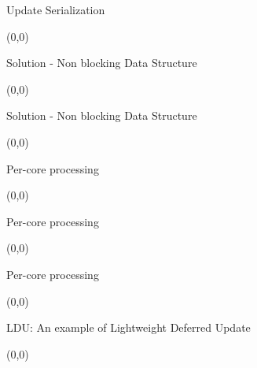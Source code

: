 \documentclass[english]{beamer} %
\begin{document}
\begin{frame}{Update Serialization}
\begin{textblock}{1}(0,0)
\end{textblock}
\end{frame}


\begin{frame}{Solution - Non blocking Data Structure}
\begin{textblock}{1}(0,0)
\end{textblock}
\end{frame}

\begin{frame}{Solution - Non blocking Data Structure}
\begin{textblock}{1}(0,0)
\end{textblock}
\end{frame}

\begin{frame}{Per-core processing}
\begin{textblock}{1}(0,0)
\end{textblock}
\end{frame}

\begin{frame}{Per-core processing}
\begin{textblock}{1}(0,0)
\end{textblock}
\end{frame}

\begin{frame}{Per-core processing}
\begin{textblock}{1}(0,0)
\end{textblock}
\end{frame}

\begin{frame}{LDU: An example of Lightweight Deferred Update}
\begin{textblock}{1}(0,0)
\end{textblock}
\end{frame}
\end{document}
